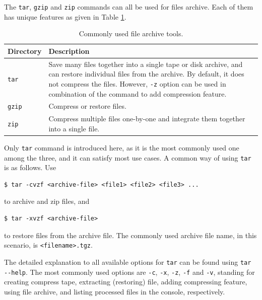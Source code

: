 The \verb|tar|, \verb|gzip| and \verb|zip| commands can all be used for files archive. Each of them has unique features as given in Table \ref{ch:fm:tab:filearchivetools}.

\begin{table}[!htb]
	\centering \caption{Commonly used file archive tools.}\label{ch:fm:tab:filearchivetools}
	\begin{tabularx}{\textwidth}{lX}
		\hline
		Directory & Description \\ \hline
		\verb|tar| & Save many files together into a single tape or disk archive, and can
		restore individual files from the archive. By default, it does not compress the files. However, \verb|-z| option can be used in combination of the command to add compression feature. \\ 
		\verb|gzip| & Compress or restore files. \\ 
		\verb|zip| & Compress multiple files one-by-one and integrate them together into a single file. \\
		\hline
	\end{tabularx}
\end{table}

Only \verb|tar| command is introduced here, as it is the most commonly used one among the three, and it can satisfy most use cases. A common way of using \verb|tar| is as follows. Use
\begin{lstlisting}
$ tar -cvzf <archive-file> <file1> <file2> <file3> ...
\end{lstlisting}
to archive and zip files, and
\begin{lstlisting}
$ tar -xvzf <archive-file>
\end{lstlisting}
to restore files from the archive file. The commonly used archive file name, in this scenario, is \verb|<filename>.tgz|.

The detailed explanation to all available options for \verb|tar| can be found using \verb|tar --help|. The most commonly used options are \verb|-c|, \verb|-x|, \verb|-z|, \verb|-f| and \verb|-v|, standing for creating compress tape, extracting (restoring) file, adding compressing feature, using file archive, and listing processed files in the console, respectively.
